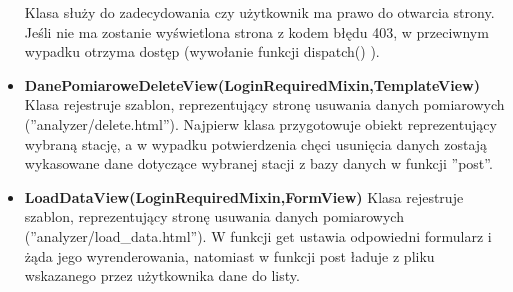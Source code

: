 \begin{itemize}
	Klasa służy do zadecydowania czy użytkownik ma prawo do otwarcia strony. Jeśli nie ma zostanie wyświetlona strona z kodem błędu 403, w przeciwnym wypadku otrzyma dostęp (wywołanie funkcji dispatch() ).
	\item \textbf{DanePomiaroweDeleteView(LoginRequiredMixin,TemplateView)}\newline
	Klasa rejestruje szablon, reprezentujący stronę usuwania danych pomiarowych (''analyzer/delete.html'').
	Najpierw klasa przygotowuje obiekt reprezentujący wybraną stację, a w wypadku potwierdzenia chęci usunięcia danych zostają wykasowane dane dotyczące wybranej stacji z bazy danych w funkcji ''post''.
	\item \textbf{LoadDataView(LoginRequiredMixin,FormView)}\newline
	Klasa rejestruje szablon, reprezentujący stronę usuwania danych pomiarowych (''analyzer/load\_data.html'').
	W funkcji get ustawia odpowiedni formularz i żąda jego wyrenderowania, natomiast w funkcji post ładuje z pliku wskazanego przez użytkownika dane do listy.

\end{itemize}

